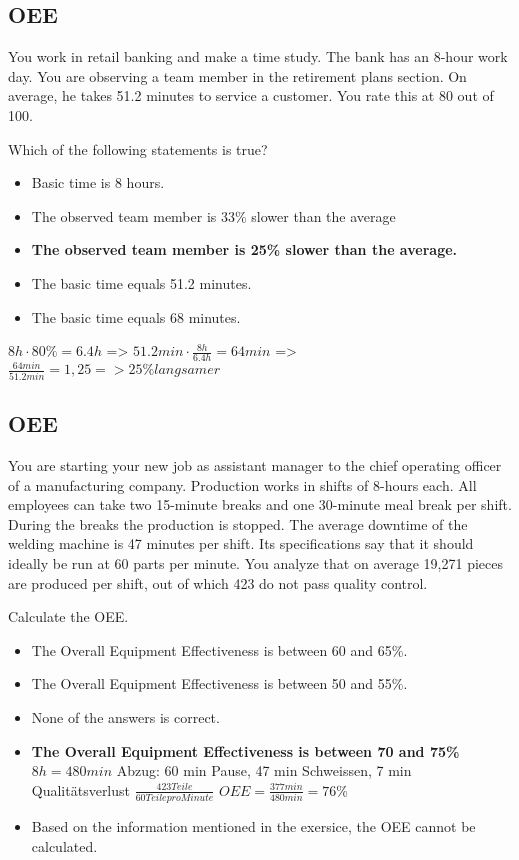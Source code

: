 \subsection{OEE}
You work in retail banking and make a time study. The bank has an 8-hour work day. You are observing a team member in the retirement plans section. On average, he takes 51.2 minutes to service a customer. You rate this at 80 out of 100. 

Which of the following statements is true?
\begin{itemize}
	\item Basic time is 8 hours.
	\item The observed team member is 33\% slower than the average
	\item \textbf{The observed team member is 25\% slower than the average.}
	\item The basic time equals 51.2 minutes. 
	\item The basic time equals 68 minutes. 
\end{itemize}
$8h \cdot 80\% = 6.4h$ =>
$51.2min \cdot \frac{8h}{ 6.4h} = 64 min$ =>
$\frac{64min}{51.2min} = 1,25 => 25\% langsamer$

\subsection{OEE}
You are starting your new job as assistant manager to the chief operating officer of a manufacturing company. Production works in shifts of 8-hours each. All employees can take two 15-minute breaks and one 30-minute meal break per shift. During the breaks the production is stopped. The average downtime of the welding machine is 47 minutes per shift. Its specifications say that it should ideally be run at 60 parts per minute. You analyze that on average 19,271 pieces are produced per shift, out of which 423 do not pass quality control.

Calculate the OEE. 
\begin{itemize}
	\item The Overall Equipment Effectiveness is between 60 and 65\%. 
	\item The Overall Equipment Effectiveness is between 50 and 55\%. 
	\item None of the answers is correct. 
	\item \textbf{The Overall Equipment Effectiveness is between 70 and 75\%}\\
	$8h = 480 min$
	Abzug: 60 min Pause, 47 min Schweissen, 7 min Qualit\"atsverlust $\frac{423Teile}{60 Teile pro Minute}$
	$OEE = \frac{377 min}{480 min} = 76\%$
	\item Based on the information mentioned in the exersice, the OEE cannot be calculated. 
\end{itemize}

